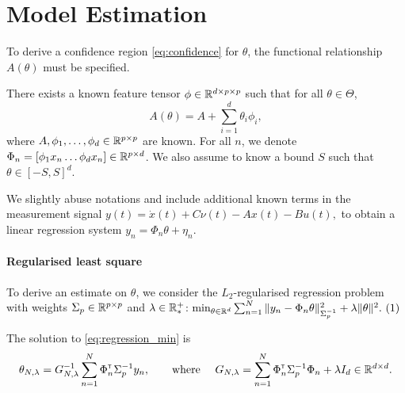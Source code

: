 \documentclass{article}
\begin{document}
\section{Model Estimation}

\label{sec:estimation}

To derive a confidence region \eqref{eq:confidence} for $\theta$, the functional relationship $A(\theta)$ must be specified.
\begin{assumption}[Structure]
\label{assumpt:structure}
There exists a known feature tensor $\phi\in \mathbb{R}^{d \times p \times p}$ such that for all $\theta\in\Theta$,
\begin{equation}
    A(\theta) = A + %
    \sum_{i=1}^d \theta_i\phi_i,
\end{equation}
where $A,\phi_1,\dots,\phi_d\in\mathbb{R}^{p\times p}$ are known. For all $n$, we denote $\Phi_n = [\phi_1 x_n \dots \phi_d x_n]\in\mathbb{R}^{p\times d}$.
We also assume to know a bound $S$ such that $\theta\in[-S,S]^d$.
\end{assumption}

We slightly abuse notations and include additional known terms in the measurement signal
$
    y(t) = \dot{x}(t) + C\nu(t) - A x(t) - Bu(t),
$ 
to obtain a linear regression system
$
y_n = \Phi_n\theta + \eta_n.
$

\paragraph{Regularised least square} To derive an estimate on $\theta$, we consider the $L_2$-regularised regression problem with weights $\Sigma_p\in\mathbb{R}^{p\times p}$ and $\lambda\in\mathbb{R}^+_*$:\hfill
$
    \min_{\theta\in\Real^d} \sum_{n=1}^N \|y_n -\Phi_n\theta\|_{\Sigma_p^{-1}}^2 + \lambda\|\theta\|_{}^2.
    \refstepcounter{equation}~(\theequation)\label{eq:regression_min}
$



\begin{proposition}
\label{prop:regularized_solution}
The solution to \eqref{eq:regression_min} is
\begin{align}
    \label{eq:vector_rls}
    \theta_{N,\lambda} = G_{N, \lambda}^{-1} \sum_{n=1}^N \Phi_n^{\mathsf{\scriptscriptstyle T}} \Sigma_p^{-1} y_n,\qquad
    \text{where }\quad G_{N, \lambda} = \sum_{n=1}^N \Phi_{n}^{\mathsf{\scriptscriptstyle T}}\Sigma_p^{-1}\Phi_{n}  + \lambda I_d \in \mathbb{R}^{d\times d}.
\end{align}
\end{proposition}
\end{document}
